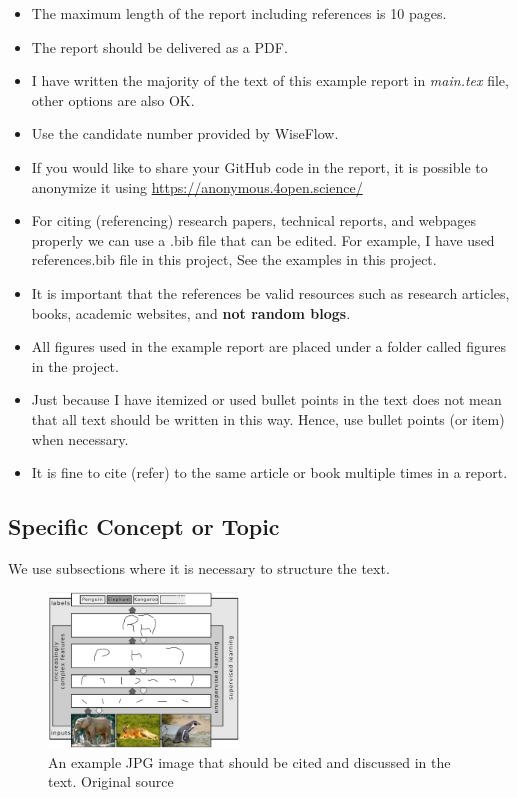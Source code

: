 \documentclass[conference]{IEEEtran}
\begin{document}
\begin{itemize}
    \item The maximum length of the report including references is 10 pages.
    \item The report should be delivered as a PDF.
    \item I have written the majority of the text of this example report in \textit{main.tex} file, other options are also OK. 
    \item Use the candidate number provided by WiseFlow.
    \item If you would like to share your GitHub code in the report, it is possible to anonymize it using \url{https://anonymous.4open.science/}
    \item For citing (referencing) research papers, technical reports, and webpages properly we can use a .bib file that can be edited. For example, I have used references.bib file in this project, See the examples in this project.
    \item It is important that the references be valid resources such as research articles, books, academic websites, and \textbf{not random blogs}.
    \item All figures used in the example report are placed under a folder called figures in the project.
    \item Just because I have itemized or used bullet points in the text does not mean that all text should be written in this way. Hence, use bullet points (or item) when necessary.
    \item It is fine to cite (refer) to the same article or book multiple times in a report.
\end{itemize}

\subsection{Specific Concept or Topic}

We use subsections where it is necessary to structure the text.
\begin{figure}[h]
    \centering
    \includegraphics[width=0.45\textwidth]{figures/Deep_Learning.jpg}
    \caption{An example JPG image that should be cited and discussed in the text.  Original source~\cite{schulz2012}}
    \label{fig:example_image}
\end{figure}
\end{document}
